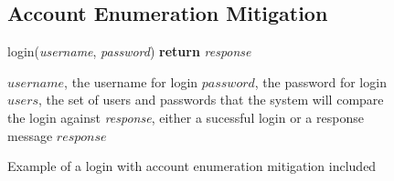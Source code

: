 \documentclass{ueacmpstyle}
\begin{document}
            \begin{figure}[ht]
                \subsection{Account Enumeration Mitigation}
                \label{sec:account-enumeration}
                \centering
                \begin{algorithm}[H]
                \caption{login(\emph{username}, \emph{password}) {\bf return} \emph{response}}
                      \begin{algorithmic}[1]
                          \Require $username$, the username for login
                          \Require $password$, the password for login
                          \Require $users$, the set of users and passwords that the system will 
                                    compare the login against
                          \Ensure \emph{response}, either a sucessful login or a response message
                              \Else
                              \EndIf
                            \Else
                            \EndIf
                          \EndFor
                          \State \Return $response$
                      \end{algorithmic}
                \end{algorithm}
                \caption{Example of a login with account enumeration mitigation included}
                \label{fig:account-enumeration}
            \end{figure}
\end{document}
